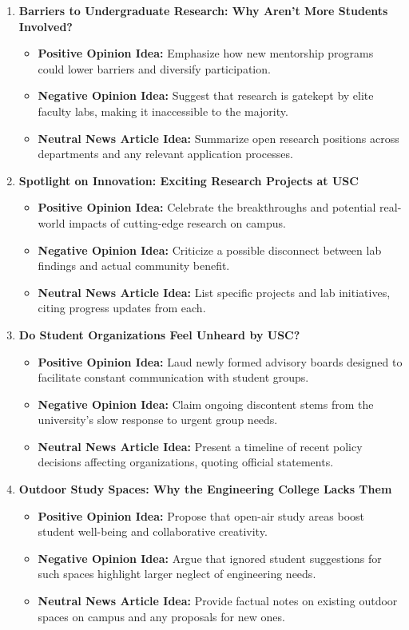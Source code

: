 \documentclass{article}
\begin{document}
\begin{enumerate}
    \item \textbf{Barriers to Undergraduate Research: Why Aren’t More Students Involved?}
    \begin{itemize}
        \item \textbf{Positive Opinion Idea:} Emphasize how new mentorship programs could lower barriers and diversify participation.
        \item \textbf{Negative Opinion Idea:} Suggest that research is gatekept by elite faculty labs, making it inaccessible to the majority.
        \item \textbf{Neutral News Article Idea:} Summarize open research positions across departments and any relevant application processes.
    \end{itemize}

    \item \textbf{Spotlight on Innovation: Exciting Research Projects at USC}
    \begin{itemize}
        \item \textbf{Positive Opinion Idea:} Celebrate the breakthroughs and potential real-world impacts of cutting-edge research on campus.
        \item \textbf{Negative Opinion Idea:} Criticize a possible disconnect between lab findings and actual community benefit.
        \item \textbf{Neutral News Article Idea:} List specific projects and lab initiatives, citing progress updates from each.
    \end{itemize}

    \item \textbf{Do Student Organizations Feel Unheard by USC?}
    \begin{itemize}
        \item \textbf{Positive Opinion Idea:} Laud newly formed advisory boards designed to facilitate constant communication with student groups.
        \item \textbf{Negative Opinion Idea:} Claim ongoing discontent stems from the university’s slow response to urgent group needs.
        \item \textbf{Neutral News Article Idea:} Present a timeline of recent policy decisions affecting organizations, quoting official statements.
    \end{itemize}

    \item \textbf{Outdoor Study Spaces: Why the Engineering College Lacks Them}
    \begin{itemize}
        \item \textbf{Positive Opinion Idea:} Propose that open-air study areas boost student well-being and collaborative creativity.
        \item \textbf{Negative Opinion Idea:} Argue that ignored student suggestions for such spaces highlight larger neglect of engineering needs.
        \item \textbf{Neutral News Article Idea:} Provide factual notes on existing outdoor spaces on campus and any proposals for new ones.
    \end{itemize}


\end{enumerate}
\end{document}
